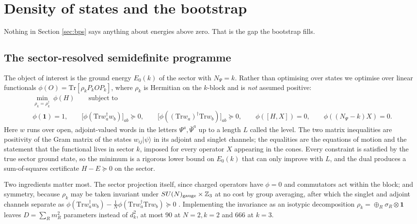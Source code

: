 \documentclass[10pt]{article}
\newcommand{\Tr}{\mathrm{Tr}}
\newcommand{\bPsi}{\bar\Psi}
\begin{document}
\section{Density of states and the bootstrap}\label{sec:bootstrap}

Nothing in Section \ref{sec:bps} says anything about energies above zero. That is the gap the bootstrap fills.

\subsection{The sector-resolved semidefinite programme}

The object of interest is the ground energy $E_0(k)$ of the sector with $N_\Psi=k$. Rather than optimising over
states we optimise over linear functionals $\phi(O)=\Tr[\rho_kP_kOP_k]$, where $\rho_k$ is Hermitian on the
$k$-block and is \emph{not} assumed positive:
\begin{equation}
\begin{gathered}
\min_{\rho_k=\rho_k^\dagger}\ \phi(H)\qquad\text{subject to}\\[3pt]
\phi(\mathbf 1)=1,\qquad
\big[\phi(\Tr w_a^\dagger w_b)\big]_{ab}\succeq0,\qquad
\big[\phi((\Tr w_a)^\dagger\Tr w_b)\big]_{ab}\succeq0,\qquad
\phi([H,X])=0,\qquad \phi((N_\Psi-k)X)=0 .
\end{gathered}
\label{eq:sdp}
\end{equation}
Here $w$ runs over open, adjoint-valued words in the letters $\Psi^a,\bPsi^a$ up to a length $L$ called the
level. The two matrix inequalities are positivity of the Gram matrix of the states $w_{ij}|\psi\rangle$ in its
adjoint and singlet channels; the equalities are the equations of motion and the statement that the functional
lives in sector $k$, imposed for every operator $X$ appearing in the cones. Every constraint is satisfied by the
true sector ground state, so the minimum is a rigorous lower bound on $E_0(k)$ that can only improve with $L$,
and the dual produces a sum-of-squares certificate $H-E\succeq0$ on the sector.

Two ingredients matter most. The sector projection itself, since charged operators have $\phi=0$ and
commutators act within the block; and symmetry, because $\rho_k$ may be taken invariant under
$SU(N)_{\rm gauge}\times\mathbb Z_3$ at no cost by group averaging, after which the singlet and adjoint channels
separate as $\phi(\Tr w_a^\dagger w_b)-\frac1N\phi(\Tr w_a^\dagger\Tr w_b)\succeq0$ \cite{Cho}. Implementing the
invariance as an isotypic decomposition $\rho_k=\oplus_R\sigma_R\otimes\mathbf 1$ leaves $D=\sum_Rm_R^2$
parameters instead of $d_k^2$, at most $90$ at $N=2,k=2$ and $666$ at $k=3$.
\end{document}
